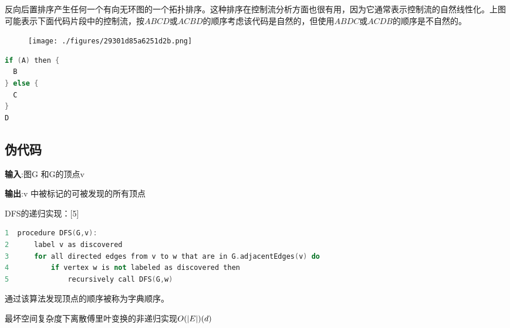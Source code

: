反向后置排序产生任何一个有向无环图的一个拓扑排序。这种排序在控制流分析方面也很有用，因为它通常表示控制流的自然线性化。上图可能表示下面代码片段中的控制流，按$A B C D$或$A C B D$的顺序考虑该代码是自然的，但使用$A B D C$或$A C D B$的顺序是不自然的。
\begin{figure}[ht]
\centering
\texttt{[image: ./figures/29301d85a6251d2b.png]}
\caption\label{fig_SDYXSS_3}
\end{figure}
\begin{lstlisting}[language=cpp]
if (A) then {
  B
} else {
  C
}
D
\end{lstlisting}

\subsection{伪代码}
\textbf{输入}:图G 和G的顶点v

\textbf{输出}:v 中被标记的可被发现的所有顶点

DFS的递归实现：[5]
\begin{lstlisting}[language=cpp]
1  procedure DFS(G,v):
2      label v as discovered
3      for all directed edges from v to w that are in G.adjacentEdges(v) do
4          if vertex w is not labeled as discovered then
5              recursively call DFS(G,w)
\end{lstlisting}
通过该算法发现顶点的顺序被称为字典顺序。

最坏空间复杂度下离散傅里叶变换的非递归实现$O(|E|) \\ (d)$
